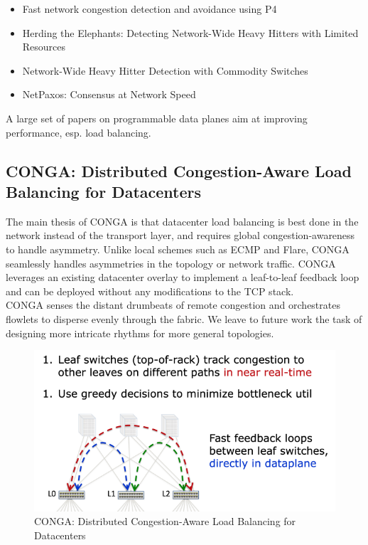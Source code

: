 \documentclass[11pt,oneside,a4paper]{article}
\begin{document}
\vspace{-\topsep}
\begin{itemize}
	\setlength{\itemsep}{0pt}
	\setlength{\parskip}{0pt}
	\item Fast network congestion detection and avoidance using P4
	\item Herding the Elephants: Detecting Network-Wide Heavy Hitters with Limited Resources
	\item Network-Wide Heavy Hitter Detection with Commodity Switches
	\item NetPaxos: Consensus at Network Speed
\end{itemize}
\vspace{-\topsep}

\noindent A large set of papers on programmable data planes aim at improving performance, esp. load balancing.

\subsection{CONGA: Distributed Congestion-Aware Load Balancing for Datacenters}

The main thesis of CONGA \cite{conga} is that datacenter load balancing is best done in the network instead of the transport layer, and requires global congestion-awareness to handle asymmetry. Unlike local schemes such as ECMP and Flare, CONGA seamlessly handles asymmetries in the topology or network traffic. CONGA leverages an existing datacenter overlay to implement a leaf-to-leaf feedback loop and can be deployed without any modifications to the TCP stack.\\
CONGA senses the distant drumbeats of remote congestion and orchestrates flowlets to disperse evenly through the fabric. We leave to future work the task of designing more intricate rhythms for more general topologies.

\begin{figure}[hb]
	\centering
	\includegraphics[width=0.5\linewidth]{figures/conga}
	\caption{CONGA: Distributed Congestion-Aware Load Balancing for Datacenters}
	\label{fig:conga}
\end{figure}
\end{document}
